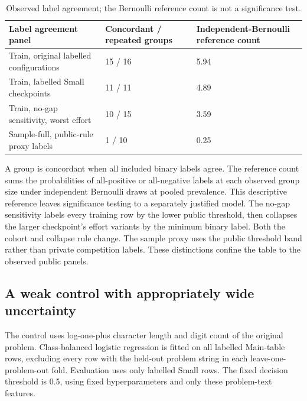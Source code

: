 \begin{table}[htbp]

\caption{Observed label agreement; the Bernoulli reference count is not a significance test.}

\label{tab:5}

\small

\begin{tabularx}{\linewidth}{@{}YYY@{}}

\toprule

\textbf{Label agreement panel} & \textbf{Concordant / repeated groups} & \textbf{Independent-Bernoulli reference count} \\

\midrule

Train, original labelled configurations & 15 / 16 & 5.94 \\

Train, labelled Small checkpoints & 11 / 11 & 4.89 \\

Train, no-gap sensitivity, worst effort & 10 / 15 & 3.59 \\

Sample-full, public-rule proxy labels & 1 / 10 & 0.25 \\

\bottomrule

\end{tabularx}

\end{table}

A group is concordant when all included binary labels agree. The reference count sums the probabilities of all-positive or all-negative labels at each observed group size under independent Bernoulli draws at pooled prevalence. This descriptive reference leaves significance testing to a separately justified model. The no-gap sensitivity labels every training row by the lower public threshold, then collapses the larger checkpoint's effort variants by the minimum binary label. Both the cohort and collapse rule change. The sample proxy uses the public threshold band rather than private competition labels. These distinctions confine the table to the observed public panels.


\subsection{A weak control with appropriately wide uncertainty}

The control uses log-one-plus character length and digit count of the original problem. Class-balanced logistic regression is fitted on all labelled Main-table rows, excluding every row with the held-out problem string in each leave-one-problem-out fold. Evaluation uses only labelled Small rows. The fixed decision threshold is 0.5, using fixed hyperparameters and only these problem-text features.


